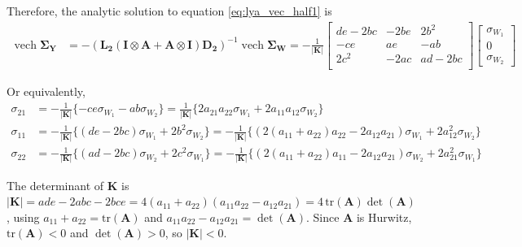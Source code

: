 \documentclass{article}
\begin{document}
Therefore, the analytic solution to equation \ref{eq:lya_vec_half1} is
\begin{equation}
\begin{aligned}
\operatorname{vech} \boldsymbol{\Sigma}_\mathbf{Y} &=
-(\mathbf{L_2}(\mathbf{I} \otimes \mathbf{A} + \mathbf{A} \otimes \mathbf{I})\mathbf{D_2})^{-1} \operatorname{vech} \boldsymbol{\Sigma}_\mathbf{W}
=-\frac{1}{|\mathbf{K}|}
{
\begin{bmatrix}
de-2bc &-2be &2b^2 \\
-ce &ae &-ab \\
2c^2 &-2ac &ad-2bc\\
\end{bmatrix}
}
\begin{bmatrix}
\sigma_{W_1}\\
0 \\
\sigma_{W_2}
\end{bmatrix}
\end{aligned}
\end{equation}

Or equivalently,
\begin{align}
\sigma_{21} &= -\frac{1}{|\mathbf{K}|} \{ -ce\sigma_{W_1}-ab\sigma_{W_2} \}
= \frac{1}{|\mathbf{K}|} \{ 2a_{21}a_{22}\sigma_{W_1}+2a_{11}a_{12}\sigma_{W_2} \} \\
\sigma_{11} &= -\frac{1}{|\mathbf{K}|} \{ (de-2bc)\sigma_{W_1}+2b^2 \sigma_{W_2} \}= -\frac{1}{|\mathbf{K}|} \{ \left (2(a_{11}+a_{22})a_{22}-2a_{12}a_{21} \right)\sigma_{W_1}+2a_{12}^2 \sigma_{W_2} \}  \\
\sigma_{22} &= -\frac{1}{|\mathbf{K}|} \{(ad-2bc)\sigma_{W_2}  +2c^2\sigma_{W_1} \}
=-\frac{1}{|\mathbf{K}|} \{ \left ( 2(a_{11}+a_{22})a_{11}- 2 a_{12}a_{21} \right)\sigma_{W_2} +2 a_{21}^2\sigma_{W_1} \}
\end{align}

The determinant of $\mathbf{K}$ is
$|\mathbf{K}|=ade-2abc-2bce=4(a_{11}+a_{22})(a_{11}a_{22}-a_{12}a_{21})
=4\,\mathrm{tr}(\mathbf{A})\det(\mathbf{A})$, using $a_{11}+a_{22}=\mathrm{tr}(\mathbf{A})$
and $a_{11}a_{22}-a_{12}a_{21}=\det(\mathbf{A})$. Since $\mathbf{A}$ is Hurwitz,
$\mathrm{tr}(\mathbf{A})<0$ and $\det(\mathbf{A})>0$, so $|\mathbf{K}|<0$.
\end{document}
